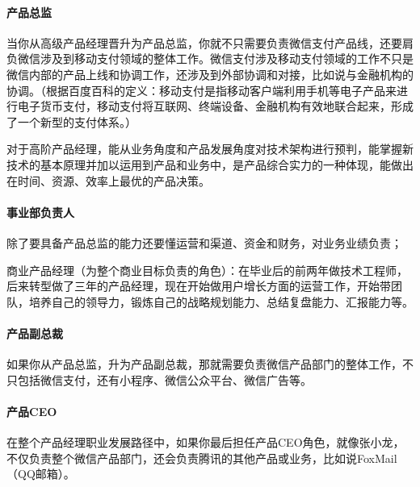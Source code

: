 \documentclass[letterpaper,11pt,english]{sphinxmanual}
\begin{document}
\paragraph{产品总监}
\label{\detokenize{chapter_experience/career_path:id11}}
当你从高级产品经理晋升为产品总监，你就不只需要负责微信支付产品线，还要肩负微信涉及到移动支付领域的整体工作。微信支付涉及移动支付领域的工作不只是微信内部的产品上线和协调工作，还涉及到外部协调和对接，比如说与金融机构的协调。（根据百度百科的定义：移动支付是指移动客户端利用手机等电子产品来进行电子货币支付，移动支付将互联网、终端设备、金融机构有效地联合起来，形成了一个新型的支付体系。）

对于高阶产品经理，能从业务角度和产品发展角度对技术架构进行预判，能掌握新技术的基本原理并加以运用到产品和业务中，是产品综合实力的一种体现，能做出在时间、资源、效率上最优的产品决策。


\paragraph{事业部负责人}
\label{\detokenize{chapter_experience/career_path:id12}}
除了要具备产品总监的能力还要懂运营和渠道、资金和财务，对业务业绩负责；

商业产品经理（为整个商业目标负责的角色）：在毕业后的前两年做技术工程师，后来转型做了三年的产品经理，现在开始做用户增长方面的运营工作，开始带团队，培养自己的领导力，锻炼自己的战略规划能力、总结复盘能力、汇报能力等。%
\begin{footnote}[603]\sphinxAtStartFootnote
{}
%
\end{footnote}


\paragraph{产品副总裁}
\label{\detokenize{chapter_experience/career_path:id13}}
如果你从产品总监，升为产品副总裁，那就需要负责微信产品部门的整体工作，不只包括微信支付，还有小程序、微信公众平台、微信广告等。


\paragraph{产品CEO}
\label{\detokenize{chapter_experience/career_path:ceo}}
在整个产品经理职业发展路径中，如果你最后担任产品CEO角色，就像张小龙，不仅负责整个微信产品部门，还会负责腾讯的其他产品或业务，比如说FoxMail（QQ邮箱）。
\end{document}
